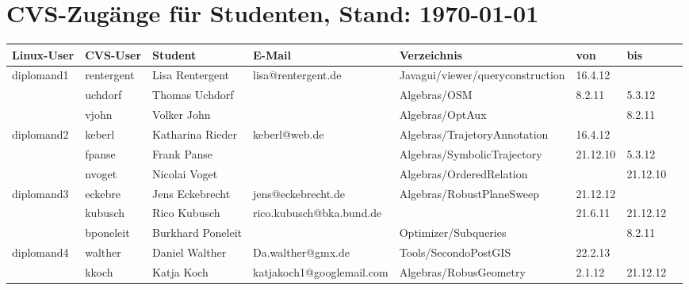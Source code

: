 \documentclass[a4paper,9pt,landscape]{scrartcl}
\begin{document}
\section{CVS-Zug\"ange f\"ur Studenten, Stand: \today}
\begin{longtabu}to 1\textwidth{|l|l|l|l|l|X|l|l|}
  \hline \hline
\textbf{Linux-User}        &\textbf{CVS-User}        &\textbf{Student}&\textbf{E-Mail}   &\textbf{Verzeichnis}            &\textbf{von}&\textbf{bis}\\
\hline
\hline\endhead
{}diplomand1 &rentergent&Lisa Rentergent &lisa@rentergent.de&Javagui/viewer/queryconstruction&16.4.12     &\\
           &uchdorf                  &Thomas Uchdorf  &                  &Algebras/OSM                    &8.2.11      &5.3.12\\
           &vjohn                    &Volker John     &                  &Algebras/OptAux                 &            &8.2.11\\
\hline
\hline
{}diplomand2 & keberl    &Katharina Rieder&keberl@web.de&Algebras/TrajetoryAnnotation                       &16.4.12     &\\
           &fpanse                   &Frank Panse     &                  &Algebras/SymbolicTrajectory     &21.12.10    &5.3.12\\
           &nvoget                   &Nicolai Voget   &                  &Algebras/OrderedRelation        &            &21.12.10\\
\hline
\hline
{}diplomand3   & eckebre   &Jens Eckebrecht &jens@eckebrecht.de&Algebras/RobustPlaneSweep       &21.12.12    & \\
             &kubusch                  &Rico Kubusch    &rico.kubusch@bka.bund.de&                          &21.6.11     &21.12.12\\
             &bponeleit                &Burkhard Poneleit&                  &Optimizer/Subqueries           &            &8.2.11\\
\hline
\hline
{}diplomand4   & walther   &Daniel Walther  &Da.walther@gmx.de &Tools/SecondoPostGIS            &22.2.13     &\\
             &kkoch                    &Katja Koch      &katjakoch1@googlemail.com&Algebras/RobusGeometry   &2.1.12      &21.12.12\\

\end{longtabu}
\end{document}
